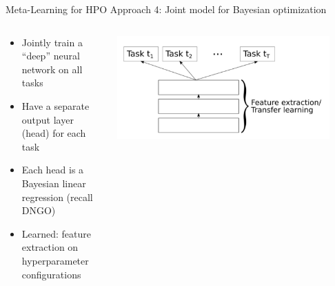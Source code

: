 \begin{frame}[c]{Meta-Learning for HPO Approach 4: Joint model for Bayesian optimization}

\begin{columns}[T] %
\begin{column}{.38\textwidth}

\begin{itemize}
    \item<1-> \alert{Jointly train} a ``deep'' neural network \alert{on all tasks} 
    \item<2-> Have a separate output layer (head) for each task 
    \item<3-> Each head is a Bayesian linear regression (recall DNGO)
    \item<4-> Learned: feature extraction on hyperparameter configurations 
\end{itemize}
\end{column}%

\hfill%

\begin{column}{.58\textwidth}
\includegraphics[width=0.9\textwidth]{../w07_hpo_speedup/images/meta_learning/perrone_int.jpg}
\end{column}%
\end{columns}

\hspace{12cm}

\end{frame}
%
%

